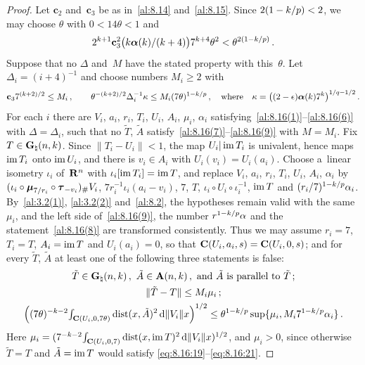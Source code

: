 \begin{proof}
    Let $\mathbf{c}_2$ and~$\mathbf{c}_3$ be as in~\ref{al:8.14} and~\ref{al:8.15}. Since $2 (1 -
    k/p) < 2$, we may choose $\theta$ with $0 < 14 \theta < 1$ and
    \begin{equation}
        \label{eq:8.16:10}
        2^{k+1} \mathbf{c}_3^2 \big( k \boldsymbol{\alpha}(k) / (k + 4) \big) 7^{k + 4}
        \theta^2 < \theta^{2 (1 - k/p)} \,.
    \end{equation}
    Suppose that no $\Delta$ and~$M$ have the stated property with this~$\theta$. Let $\Delta_i =
    (i+4)^{-1}$ and choose numbers $M_i \ge 2$ with
    \begin{equation}
        \label{eq:8.16:12}
        \mathbf{c}_3 7^{(k+2)/2} \le M_i \,, \qquad \theta^{-(k+2)/2} \Delta_i^{-1} \kappa
        \le M_i (7 \theta)^{1 - k/p} \,, \quad \text{where} \quad \kappa = \big( (2 - \epsilon)
        \boldsymbol{\alpha}(k) 7^{k} \big)^{1/q - 1/2} \,.
    \end{equation}
    For each $i$ there are $V_i$, $a_i$, $r_i$, $T_i$, $U_i$, $A_i$, $\mu_i$, $\alpha_i$
    satisfying~\ref{al:8.16(1)}--\ref{al:8.16(6)} with $\Delta = \Delta_i$, such that no $\tilde T$,
    $\tilde A$ satisfy~\ref{al:8.16(7)}--\ref{al:8.16(9)} with $M = M_i$. Fix $T \in
    \mathbf{G}_{\natural}(n,k)$. Since $\|T_i - U_i\| < 1$, the map $U_i | \operatorname{im} T_i$ is univalent, hence
    maps $\operatorname{im} T_i$ onto $\operatorname{im} U_i$, and there is $v_i \in A_i$ with $U_i(v_i) = U_i(a_i)$. Choose
    a~linear isometry $\iota_i$ of~$\mathbf{R}^{n}$ with $\iota_i[\operatorname{im} T_i] = \operatorname{im} T$, and replace $V_i$,
    $a_i$, $r_i$, $T_i$, $U_i$, $A_i$, $\alpha_i$ by $(\iota_i \circ \boldsymbol{\mu}_{7/r_i} \circ
    \boldsymbol{\tau}_{-v_i})_\# V_i$, $7 r_i^{-1} \iota_i(a_i - v_i)$, $7$, $T$, $\iota_i \circ U_i \circ
    \iota_i^{-1}$, $\operatorname{im} T$ and $(r_i/7)^{1 - k/p} \alpha_i$. By~\ref{al:3.2(1)}, \ref{al:3.2(2)}
    and~\ref{al:8.2}, the hypotheses remain valid with the same $\mu_i$, and the left side
    of~\ref{al:8.16(9)}, the number $r^{1-k/p} \alpha$ and the statement~\ref{al:8.16(8)} are
    transformed consistently. Thus we may assume $r_i = 7$, $T_i = T$, $A_i = \operatorname{im} T$ and $U_i(a_i) =
    0$, so that $\mathbf{C} ( U_i, a_i, s ) = \mathbf{C} ( U_i, 0, s )$; and for every $\tilde T$, $\tilde A$ at
    least one of the following three statements is false:
    \begin{gather}
        \label{eq:8.16:19}
        \tilde T \in \mathbf{G}_{\natural}(n,k) \,, \ \tilde A \in \mathbf{A}(n,k) \,, \text{ and
        $\tilde A$ is parallel to $\tilde T$} \,; \\
        \label{eq:8.16:20}
        \|\tilde T - T\| \le M_i \mu_i \,; \\
        \label{eq:8.16:21}
        \Big( (7 \theta)^{-k-2} {\textstyle\int_{\mathbf{C} ( U_i, 0, 7 \theta )}^{}} \operatorname{dist}(x, \tilde A)^2 \,\mathrm{d}
        \|V_i\| x \Big)^{1/2} \le \theta^{1 - k/p} \sup \{ \mu_i, M_i 7^{1 - k/p} \alpha_i \}
        \,.
    \end{gather}
    Here $\mu_i = (7^{-k-2} {\textstyle\int_{\mathbf{C} ( U_i, 0, 7 )}^{}} \operatorname{dist}(x, \operatorname{im} T)^2 \,\mathrm{d} \|V_i\|
    x)^{1/2}$, and $\mu_i > 0$, since otherwise $\tilde T = T$ and $\tilde A = \operatorname{im} T$ would satisfy
    \eqref{eq:8.16:19}--\eqref{eq:8.16:21}.


\end{proof}
